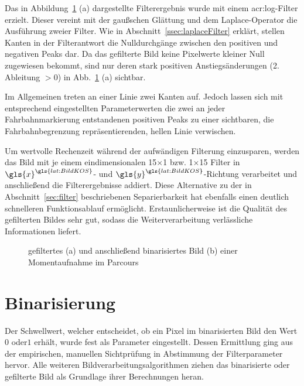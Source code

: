Das in Abbildung~\ref{fig:bildvorverarbeitung_filtern} (a) dargestellte Filterergebnis wurde mit einem \gls{acr:log}-Filter erzielt. Dieser vereint mit der gaußschen Glättung und dem Laplace-Operator die Ausführung zweier Filter. Wie in Abschnitt~\ref{ssec:laplaceFilter} erklärt, stellen Kanten in der Filterantwort die Nulldurchgänge zwischen den positiven und negativen Peaks dar. Da das gefilterte Bild keine Pixelwerte kleiner Null zugewiesen bekommt, sind nur deren stark positiven Anstiegsänderungen (2. Ableitung \( > 0\)) in Abb.~\ref{fig:bildvorverarbeitung_filtern} (a) sichtbar. 

Im Allgemeinen treten an einer Linie zwei Kanten auf. Jedoch lassen sich mit entsprechend eingestellten Parameterwerten die zwei an jeder Fahrbahnmarkierung entstandenen positiven Peaks zu einer sichtbaren, die Fahrbahnbegrenzung repräsentierenden, hellen Linie verwischen. 

Um wertvolle Rechenzeit während der aufwändigen Filterung einzusparen, werden das Bild mit je einem eindimensionalen 15\( \times \)1 bzw. 1\( \times \)15 Filter in \( {\gls{x}}^{\gls{lat:BildKOS}} \)- und \( {\gls{y}}^{\gls{lat:BildKOS}} \)-Richtung verarbeitet und anschließend die Filterergebnisse addiert. Diese Alternative zu der in Abschnitt~\ref{sec:filter} beschriebenen Separierbarkeit hat ebenfalls einen deutlich schnelleren Funktionsablauf ermöglicht. Erstaunlicherweise ist die Qualität des gefilterten Bildes sehr gut, sodass die Weiterverarbeitung verlässliche Informationen liefert.


\begin{figure}[hbtp] %
  \centering
  \hfill
  \caption{gefiltertes (a) und anschließend binarisiertes Bild (b) einer Momentaufnahme im Parcours}
\label{fig:bildvorverarbeitung_filtern}
\end{figure} 

\section{Binarisierung \dcfirstauthorshort}
\label{sec:bildvorverarbeitung:binarisierung}
Der Schwellwert, welcher entscheidet, ob ein Pixel im binarisierten Bild den Wert \glqq \(0\)\grqq{} oder\glqq \(1\)\grqq{} erhält, wurde fest als Parameter eingestellt. Dessen Ermittlung ging aus der empirischen, manuellen Sichtprüfung in Abstimmung der Filterparameter hervor. Alle weiteren Bildverarbeitungsalgorithmen ziehen das binarisierte oder gefilterte Bild als Grundlage ihrer Berechnungen heran.